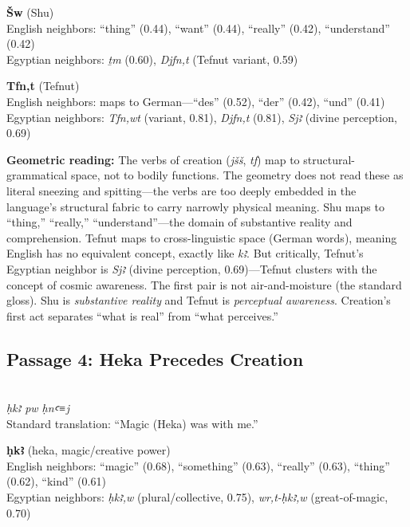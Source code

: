 \documentclass[11pt, a4paper]{article}
\newcommand{\passagehiero}[1]{{\normalfont\hierofont\fontsize{14}{17}\selectfont #1}}
\begin{document}
\medskip

\noindent\textbf{Šw} (Shu)\\
English neighbors: ``thing'' (0.44), ``want'' (0.44), ``really'' (0.42), ``understand'' (0.42)\\
Egyptian neighbors: \textit{ṯm} (0.60), \textit{Djfn,t} (Tefnut variant, 0.59)

\medskip

\noindent\textbf{Tfn,t} (Tefnut)\\
English neighbors: maps to German---``des'' (0.52), ``der'' (0.42), ``und'' (0.41)\\
Egyptian neighbors: \textit{Tfn,wt} (variant, 0.81), \textit{Djfn,t} (0.81), \textit{Sjꜣ} (divine perception, 0.69)

\medskip

{\color{insight}\textbf{Geometric reading:}} The verbs of creation (\textit{jšš}, \textit{tf}) map to structural-grammatical space, not to bodily functions. The geometry does not read these as literal sneezing and spitting---the verbs are too deeply embedded in the language's structural fabric to carry narrowly physical meaning. Shu maps to ``thing,'' ``really,'' ``understand''---the domain of substantive reality and comprehension. Tefnut maps to cross-linguistic space (German words), meaning English has no equivalent concept, exactly like \textit{kꜣ}. But critically, Tefnut's Egyptian neighbor is \textit{Sjꜣ} (divine perception, 0.69)---Tefnut clusters with the concept of cosmic awareness. The first pair is not air-and-moisture (the standard gloss). Shu is \textit{substantive reality} and Tefnut is \textit{perceptual awareness}. Creation's first act separates ``what is real'' from ``what perceives.''

\subsection{Passage 4: Heka Precedes Creation}

{\color{passage}\passagehiero{𓎛𓎡𓄿 𓊪𓅱 𓎛𓈖𓂝𓇋}\\\medskip
\textit{\small ḥkꜣ pw ḥnꜥ≡j}\\
Standard translation: ``Magic (Heka) was with me.''}

\bigskip

\noindent\textbf{ḥkꜣ} (heka, magic/creative power)\\
English neighbors: ``magic'' (0.68), ``something'' (0.63), ``really'' (0.63), ``thing'' (0.62), ``kind'' (0.61)\\
Egyptian neighbors: \textit{ḥkꜣ,w} (plural/collective, 0.75), \textit{wr,t-ḥkꜣ,w} (great-of-magic, 0.70)
\end{document}
